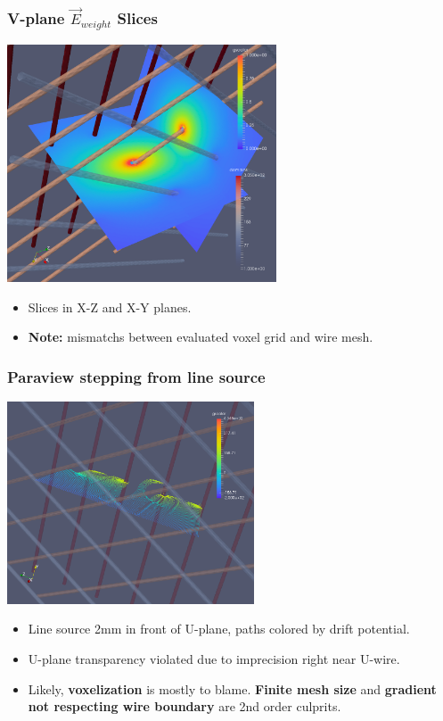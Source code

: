\documentclass[xcolor=dvipsnames]{beamer}
\begin{document}
\begin{frame}
  \frametitle{V-plane $\vec{E}_{weight}$ Slices}
  \begin{center}
    \includegraphics[width=0.6\textwidth]{cap-vweight-field-fine-slices.png}
  \end{center}

  \begin{itemize}\footnotesize
  \item Slices in X-Z and X-Y planes.
  \item \textbf{Note:} mismatchs between evaluated voxel grid and wire mesh.
  \end{itemize}
\end{frame}

\begin{frame}
  \frametitle{Paraview stepping from line source}
  \begin{center}
    \includegraphics[width=0.55\textwidth]{track-drift-2.png}
  \end{center}

  \begin{itemize}\footnotesize
  \item Line source 2mm in front of U-plane,  paths colored by drift potential.
  \item U-plane transparency violated due to imprecision right near U-wire.
  \item Likely, \textbf{voxelization} is mostly to blame.  \textbf{Finite mesh size}
    and \textbf{gradient not respecting wire boundary} are 2nd order culprits.
  \end{itemize}
\end{frame}
\end{document}
